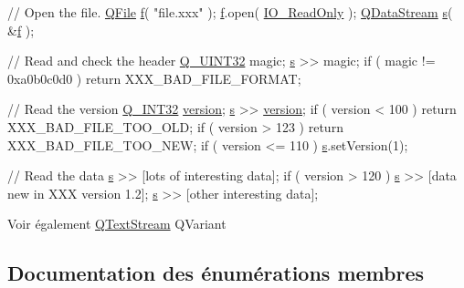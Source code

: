 \begin{DoxyCode}
\textcolor{comment}{// Open the file.}
\hyperlink{class_q_file}{QFile} \hyperlink{namespaceversion_adc2f36e5bef89e3881981af504e0e31d}{f}( \textcolor{stringliteral}{"file.xxx"} );
\hyperlink{namespaceversion_adc2f36e5bef89e3881981af504e0e31d}{f}.open( \hyperlink{qiodevice_8h_ab5766c5e147f3dfced5890741f22063a}{IO\_ReadOnly} );
\hyperlink{class_q_data_stream}{QDataStream} \hyperlink{058__bracket__recursion_8tcl_a011c73f2dbb87635a3b4206c72355f6e}{s}( &\hyperlink{namespaceversion_adc2f36e5bef89e3881981af504e0e31d}{f} );

\textcolor{comment}{// Read and check the header}
\hyperlink{qglobal_8h_a7d7782cbf40536d689976070bd0cfd27}{Q\_UINT32} magic;
\hyperlink{058__bracket__recursion_8tcl_a011c73f2dbb87635a3b4206c72355f6e}{s} >> magic;
\textcolor{keywordflow}{if} ( magic != 0xa0b0c0d0 )
\textcolor{keywordflow}{return} XXX\_BAD\_FILE\_FORMAT;

\textcolor{comment}{// Read the version}
\hyperlink{qglobal_8h_a7adc07f83f3448f63c6b02e33b573b06}{Q\_INT32} \hyperlink{class_q_data_stream_ae140798d7698d48eb9b0be4f3e492735}{version};
\hyperlink{058__bracket__recursion_8tcl_a011c73f2dbb87635a3b4206c72355f6e}{s} >> \hyperlink{class_q_data_stream_ae140798d7698d48eb9b0be4f3e492735}{version};
\textcolor{keywordflow}{if} ( version < 100 )
\textcolor{keywordflow}{return} XXX\_BAD\_FILE\_TOO\_OLD;
\textcolor{keywordflow}{if} ( version > 123 )
\textcolor{keywordflow}{return} XXX\_BAD\_FILE\_TOO\_NEW;
\textcolor{keywordflow}{if} ( version <= 110 )
\hyperlink{058__bracket__recursion_8tcl_a011c73f2dbb87635a3b4206c72355f6e}{s}.setVersion(1);

\textcolor{comment}{// Read the data}
\hyperlink{058__bracket__recursion_8tcl_a011c73f2dbb87635a3b4206c72355f6e}{s} >> [lots of interesting data];
\textcolor{keywordflow}{if} ( version > 120 )
\hyperlink{058__bracket__recursion_8tcl_a011c73f2dbb87635a3b4206c72355f6e}{s} >> [data \textcolor{keyword}{new} in XXX version 1.2];
\hyperlink{058__bracket__recursion_8tcl_a011c73f2dbb87635a3b4206c72355f6e}{s} >> [other interesting data];
\end{DoxyCode}


\begin{DoxySeeAlso}{Voir également}
\hyperlink{class_q_text_stream}{Q\+Text\+Stream} Q\+Variant 
\end{DoxySeeAlso}


\subsection{Documentation des énumérations membres}
\hypertarget{class_q_data_stream_a0cc872752a2cc23a0cf2bcb359cdf135}{}
